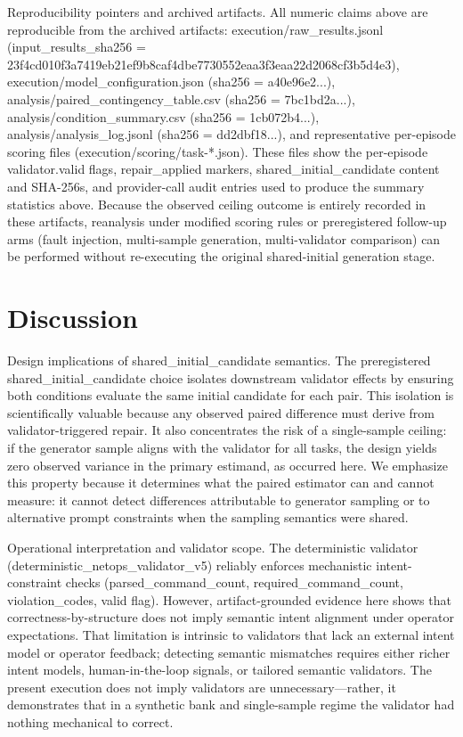 \documentclass[conference]{IEEEtran}
\begin{document}
Reproducibility pointers and archived artifacts. All numeric claims above are reproducible from the archived artifacts: execution/raw\_results.jsonl (input\_results\_sha256 = 23f4cd01\allowbreak{}0f3a7419\allowbreak{}eb21ef9b\allowbreak{}8caf4dbe\allowbreak{}7730552e\allowbreak{}aa3f3eaa\allowbreak{}22d2068c\allowbreak{}f3b5d4e3), execution/model\_configuration.json (sha256 = a40e96e2...), analysis/paired\_contingency\_table.csv (sha256 = 7bc1bd2a...), analysis/condition\_summary.csv (sha256 = 1cb072b4...), analysis/analysis\_log.jsonl (sha256 = dd2dbf18...), and representative per-episode scoring files (execution/scoring/task-*.json). These files show the per-episode validator.valid flags, repair\_applied markers, shared\_initial\_candidate content and SHA-256s, and provider-call audit entries used to produce the summary statistics above. Because the observed ceiling outcome is entirely recorded in these artifacts, reanalysis under modified scoring rules or preregistered follow-up arms (fault injection, multi-sample generation, multi-validator comparison) can be performed without re-executing the original shared-initial generation stage.

\section{Discussion}
Design implications of shared\_initial\_candidate semantics. The preregistered shared\_initial\_candidate choice isolates downstream validator effects by ensuring both conditions evaluate the same initial candidate for each pair. This isolation is scientifically valuable because any observed paired difference must derive from validator-triggered repair. It also concentrates the risk of a single-sample ceiling: if the generator sample aligns with the validator for all tasks, the design yields zero observed variance in the primary estimand, as occurred here. We emphasize this property because it determines what the paired estimator can and cannot measure: it cannot detect differences attributable to generator sampling or to alternative prompt constraints when the sampling semantics were shared.

Operational interpretation and validator scope. The deterministic validator (deterministic\_netops\_validator\_v5) reliably enforces mechanistic intent-constraint checks (parsed\_command\_count, required\_command\_count, violation\_codes, valid flag). However, artifact-grounded evidence here shows that correctness-by-structure does not imply semantic intent alignment under operator expectations. That limitation is intrinsic to validators that lack an external intent model or operator feedback; detecting semantic mismatches requires either richer intent models, human-in-the-loop signals, or tailored semantic validators. The present execution does not imply validators are unnecessary---rather, it demonstrates that in a synthetic bank and single-sample regime the validator had nothing mechanical to correct.
\end{document}
